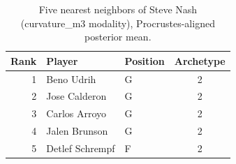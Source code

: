 \begin{table}[htbp]
  \centering\small
  \begin{tabular}{rllc}
    \toprule
    Rank & Player & Position & Archetype \\
    \midrule
    1 & Beno Udrih & G & 2 \\
    2 & Jose Calderon & G & 2 \\
    3 & Carlos Arroyo & G & 2 \\
    4 & Jalen Brunson & G & 2 \\
    5 & Detlef Schrempf & F & 2 \\
    \bottomrule
  \end{tabular}
  \caption{Five nearest neighbors of Steve Nash (curvature_m3 modality), Procrustes-aligned posterior mean.}
  \label{tab:Steve_Nash_neighbors_curvature_m3}
\end{table}

